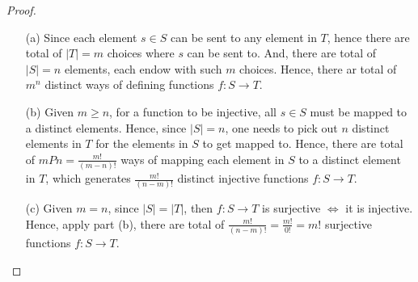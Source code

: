 \documentclass{article}
\begin{document}
\begin{proof}

    \hfil

    \begin{itemize}
        \item[(a)] Since each element $s \in S$ can be sent to any element in $T$, hence there are total of $|T|=m$ choices where $s$ can be sent to. And, there are total of $|S| = n$ elements, each endow with such $m$ choices. Hence, there ar total of $m^n$ distinct ways of defining functions $f:S \rightarrow T$.
        \item[(b)] Given $m\geq n$, for a function to be injective, all $s \in S$ must be mapped to a distinct elements. Hence, since $|S|=n$, one needs to pick out $n$ distinct elements in $T$ for the elements in $S$ to get mapped to. Hence, there are total of $mPn = \frac{m!}{(m-n)!}$ ways of mapping each element in $S$ to a distinct element in $T$, which generates $\frac{m!}{(n-m)!}$ distinct injective functions $f:S\rightarrow T$.
        \item[(c)] Given $m=n$, since $|S|=|T|$, then $f:S \rightarrow T$ is surjective $\iff$ it is injective. Hence, apply part (b), there are total of $\frac{m!}{(n-m)!}=\frac{m!}{0!}=m!$ surjective functions $f:S\rightarrow T$.   
    \end{itemize}
\end{proof}

\hfil
\end{document}
